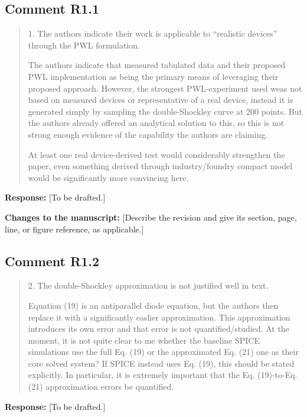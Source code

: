 \documentclass[11pt,a4paper]{article}
\newenvironment{reviewercomment}
  {\begin{quote}\small\color{reviewerblue}}
  {\end{quote}}
\newcommand{\placeholder}[1]{[#1]}
\begin{document}
\subsection*{Comment R1.1}
\begin{reviewercomment}
1. The authors indicate their work is applicable to ``realistic devices''
through the PWL formulation.

The authors indicate that measured tabulated data and their proposed PWL
implementation as being the primary means of leveraging their proposed
approach. However, the strongest PWL-experiment used weas not based on
measured devices or representative of a real device, instead it is
generated simply by sampling the double-Shockley curve at 200 points. But
the authors already offered an analytical solution to this, so this is
not strong enough evidence of the capability the authors are claiming.

At least one real device-derived test would considerably strengthen the
paper, even something derived through industry/foundry compact model
would be significantly more convincing here.
\end{reviewercomment}

\noindent\textbf{Response:}
\placeholder{To be drafted.}

\noindent\textbf{Changes to the manuscript:}
\placeholder{Describe the revision and give its section, page, line, or figure reference, as applicable.}

\subsection*{Comment R1.2}
\begin{reviewercomment}
2. The double-Shockley approximation is not justified well in text.

Equation (19) is an antiparallel diode equation, but the authors then
replace it with a significantly easlier approximation. This approximation
introduces its own error and that error is not quantified/studied. At the
moment, it is not quite clear to me whether the baseline SPICE simulations
use the full Eq. (19) or the approximated Eq. (21) one as their core solved
system? If SPICE instead uses Eq. (19), this should be stated explicitly.
In particular, it is extremely important that the Eq. (19)-to-Eq. (21)
approximation errors be quantified.
\end{reviewercomment}

\noindent\textbf{Response:}
\placeholder{To be drafted.}
\end{document}
